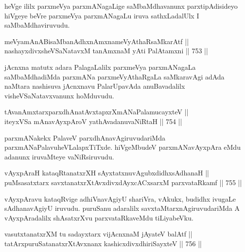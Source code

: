 \begin{artha} 
heVge ililx parxmeVya parxmANagaLige saMbaMdhavanunx parxtipAdisideyo hiVgeye beVre parxmeVya parxmANagaLu iruva sathxLadalUlx I saMbaMdhaviruvudu. 
\end{artha}

\begin{shl}
meVyamAnABisaMbanAdhxnAmxnameVyAthaRsaMkarAtf ||  \\
nashayxdivxsheVSaNatavxM tanAmxnaM yAti PalAtamxni \hfill || 753 ||  
\end{shl}

\begin{artha} 
jAcnxna matutx adara PalagaLalilx parxmeVya parxmANagaLa saMbaMdhadiMda parxmANa parxmeVyAthaRgaLa saMkaravAgi adAda naMtara nashisuva jAcnxnavu PalarUpavAda anuBavadalilx visheVSaNatavxvanunx hoMduvudu.
\end{artha}

\begin{shl}
tAvanAmxtarxparxdhAnatAvxtapxrXmANaPalamucayxteV || \\
iteyxVSa mAnavAyxpAroV yathAvadanuvaNiRtaH \hfill || 754 ||  
\end{shl}

\begin{artha} 
parxmANakekx PalaveV parxdhAnavAgiruvudariMda parxmANaPalavu\break heVLalapxTiTxde. hiVgeMbudeV parxmANavAyxpAra eMdu adanunx iruvaMteye vaNiRsiruvudu.
\end{artha}


\begin{shl}
vAyxpAraH kataqRtanatxrXH sAyxtatxnuvAgubxdidhxsAdhanaH || \\
puMsasatxtarx savxtanatxrXtAvxdivxdAyxcACxsarxM parxvataRkamf \hfill || 755 ||  
\end{shl}

\begin{artha} 
vAyxpAravu kataqRvige adhiVnavAgiyU shariVra, vAkukx, budidhx ivugaLe 
sAdhanavAgiyU iruvudu. puruSanu adaralilx savxtaMtarxnAgiruvudariMda A 
vAyxpAradalilx shAsatxrXvu parxvataRkaveMdu tiLiyabeVku.
\end{artha}

\begin{shl}
vasutxtanatxrXM tu sadayxtarx vijAcnxnaM jAyateV balAtf || \\
tatArxpuruSatanatxrXtAvxnanx kashicxdivxdhiriSayxteV \hfill || 756 ||  
\end{shl}

